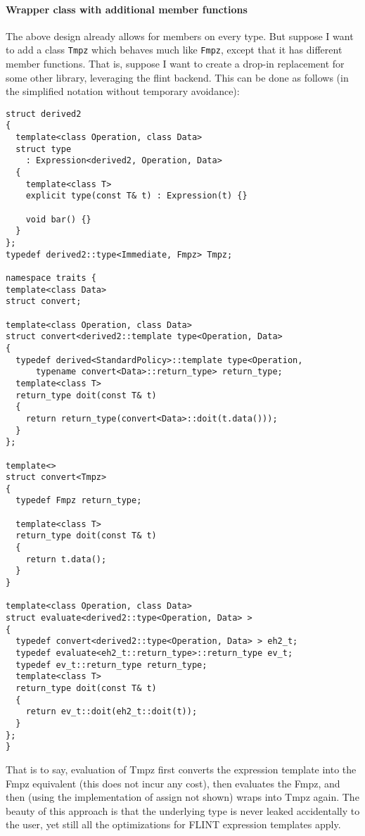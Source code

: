 \documentclass{scrartcl}
\begin{document}
\paragraph{Wrapper class with additional member functions}

The above design already allows for members on every type. But suppose I
want to add a class \texttt{Tmpz} which behaves much
like \texttt{Fmpz}, except that it has different member functions. That is,
suppose I want to create a drop-in replacement for some other library,
leveraging the flint backend. This can be done as follows (in the
simplified notation without temporary avoidance):

\begin{verbatim}
struct derived2
{
  template<class Operation, class Data>
  struct type
    : Expression<derived2, Operation, Data>
  {
    template<class T>
    explicit type(const T& t) : Expression(t) {}

    void bar() {}
  }
};
typedef derived2::type<Immediate, Fmpz> Tmpz;

namespace traits {
template<class Data>
struct convert;

template<class Operation, class Data>
struct convert<derived2::template type<Operation, Data>
{
  typedef derived<StandardPolicy>::template type<Operation,
      typename convert<Data>::return_type> return_type;
  template<class T>
  return_type doit(const T& t)
  {
    return return_type(convert<Data>::doit(t.data()));
  }
};

template<>
struct convert<Tmpz>
{
  typedef Fmpz return_type;

  template<class T>
  return_type doit(const T& t)
  {
    return t.data();
  }
}

template<class Operation, class Data>
struct evaluate<derived2::type<Operation, Data> >
{
  typedef convert<derived2::type<Operation, Data> > eh2_t;
  typedef evaluate<eh2_t::return_type>::return_type ev_t;
  typedef ev_t::return_type return_type;
  template<class T>
  return_type doit(const T& t)
  {
    return ev_t::doit(eh2_t::doit(t));
  }
};
}
\end{verbatim}

That is to say, evaluation of Tmpz first converts the expression template
into the Fmpz equivalent (this does not incur any cost), then evaluates the
Fmpz, and then (using the implementation of assign not shown) wraps into
Tmpz again. The beauty of this approach is that the underlying type is
never leaked accidentally to the user, yet still all the optimizations for
FLINT expression templates apply.
\end{document}
